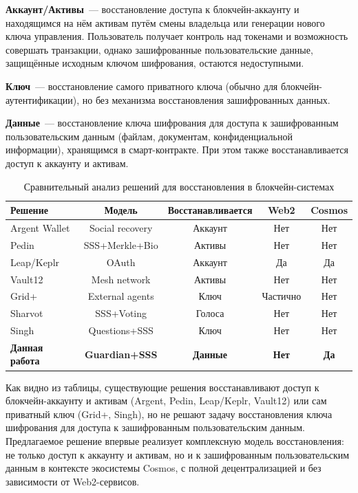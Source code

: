 \documentclass[12pt]{a&t}
\begin{document}
\begin{itemlist}
\item
\textbf{Аккаунт/Активы}~--- восстановление доступа к блокчейн-аккаунту и находящимся на нём активам путём смены владельца или генерации нового ключа управления. Пользователь получает контроль над токенами и возможность совершать транзакции, однако зашифрованные пользовательские данные, защищённые исходным ключом шифрования, остаются недоступными.

\item
\textbf{Ключ}~--- восстановление самого приватного ключа (обычно для блокчейн-аутентификации), но без механизма восстановления зашифрованных данных.

\item
\textbf{Данные}~--- восстановление ключа шифрования для доступа к зашифрованным пользовательским данным (файлам, документам, конфиденциальной информации), хранящимся в смарт-контракте. При этом также восстанавливается доступ к аккаунту и активам.
\end{itemlist}

\begin{table}[h]
\centering
\caption{Сравнительный анализ решений для восстановления в блокчейн-системах}
\label{tab:comparison}
\begin{tabular}{|l|c|c|c|c|}
\hline
\textbf{Решение} & \textbf{Модель} & \textbf{Восстанавливается} & \textbf{Web2} & \textbf{Cosmos} \\
\hline
Argent Wallet & Social recovery & Аккаунт & Нет & Нет \\
\hline
Pedin~\cite{pedin2023} & SSS+Merkle+Bio & Активы & Нет & Нет \\
\hline
Leap/Keplr & OAuth & Аккаунт & Да & Да \\
\hline
Vault12~\cite{vault12} & Mesh network & Активы & Нет & Нет \\
\hline
Grid+~\cite{gridplus} & External agents & Ключ & Частично & Нет \\
\hline
Sharvot~\cite{sharvot} & SSS+Voting & Голоса & Нет & Нет \\
\hline
Singh~\cite{singh2021} & Questions+SSS & Ключ & Нет & Нет \\
\hline
\textbf{Данная работа} & \textbf{Guardian+SSS} & \textbf{Данные} & \textbf{Нет} & \textbf{Да} \\
\hline
\end{tabular}
\end{table}

Как видно из таблицы, существующие решения восстанавливают доступ к блокчейн-аккаунту и активам (Argent, Pedin, Leap/Keplr, Vault12) или сам приватный ключ (Grid+, Singh), но не решают задачу восстановления ключа шифрования для доступа к зашифрованным пользовательским данным. Предлагаемое решение впервые реализует комплексную модель восстановления: не только доступ к аккаунту и активам, но и к зашифрованным пользовательским данным в контексте экосистемы Cosmos, с полной децентрализацией и без зависимости от Web2-сервисов.
\end{document}
